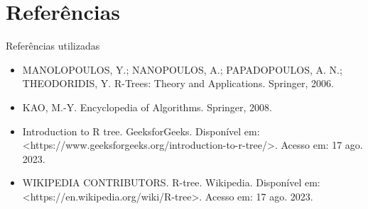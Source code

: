 \documentclass[compress,aspectratio=169]{beamer}
\begin{document}
\section{Referências}
\begin{frame}{Referências utilizadas}
    
    \begin{justify}
        \begin{itemize}
           \item MANOLOPOULOS, Y.; NANOPOULOS, A.; PAPADOPOULOS, A. N.; THEODORIDIS, Y. R-Trees: Theory and Applications. Springer, 2006. 
           \item KAO, M.-Y. Encyclopedia of Algorithms. Springer, 2008.
           \item Introduction to R tree. GeeksforGeeks. Disponível em: <https://www.geeksforgeeks.org/introduction-to-r-tree/>. Acesso em: 17 ago. 2023.
           \item WIKIPEDIA CONTRIBUTORS. R-tree. Wikipedia. Disponível em: <https://en.wikipedia.org/wiki/R-tree>. Acesso em: 17 ago. 2023.
        \end{itemize}
    \end{justify}
\end{frame}
\end{document}
